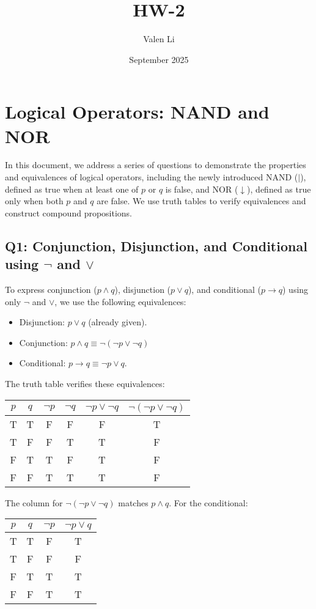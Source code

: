 \documentclass[12pt]{article}
\title{HW-2}
\author{Valen Li}
\date{September 2025}
\begin{document}
\section*{Logical Operators: NAND and NOR}

In this document, we address a series of questions to demonstrate the properties and equivalences of logical operators, including the newly introduced NAND ($|$), defined as true when at least one of $p$ or $q$ is false, and NOR ($\downarrow$), defined as true only when both $p$ and $q$ are false. We use truth tables to verify equivalences and construct compound propositions.

\subsection*{Q1: Conjunction, Disjunction, and Conditional using $\neg$ and $\vee$}
To express conjunction ($p \wedge q$), disjunction ($p \vee q$), and conditional ($p \to q$) using only $\neg$ and $\vee$, we use the following equivalences:
\begin{itemize}
    \item Disjunction: $p \vee q$ (already given).
    \item Conjunction: $p \wedge q \equiv \neg(\neg p \vee \neg q)$
    \item Conditional: $p \to q \equiv \neg p \vee q$.
\end{itemize}
The truth table verifies these equivalences:

\begin{center}
\begin{tabular}{cc|cccc}
\toprule
$p$ & $q$ & $\neg p$ & $\neg q$ & $\neg p \vee \neg q$ & $\neg(\neg p \vee \neg q)$ \\
\midrule
T & T & F & F & F & T \\
T & F & F & T & T & F \\
F & T & T & F & T & F \\
F & F & T & T & T & F \\
\bottomrule
\end{tabular}
\end{center}

The column for $\neg(\neg p \vee \neg q)$ matches $p \wedge q$. For the conditional:

\begin{center}
\begin{tabular}{cc|cc}
\toprule
$p$ & $q$ & $\neg p$ & $\neg p \vee q$ \\
\midrule
T & T & F & T \\
T & F & F & F \\
F & T & T & T \\
F & F & T & T \\
\bottomrule
\end{tabular}
\end{center}
\end{document}
